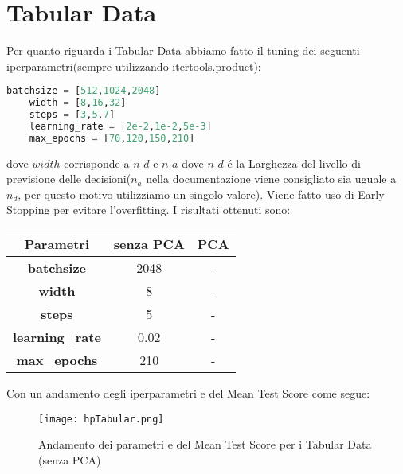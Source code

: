 \documentclass[../../Report.tex]{subfiles}
\begin{document}
\section{Tabular Data}
Per quanto riguarda i Tabular Data abbiamo fatto il tuning dei seguenti iperparametri(sempre utilizzando itertools.product):
\begin{lstlisting}[language=Python]
    batchsize = [512,1024,2048]
    width = [8,16,32]
    steps = [3,5,7]
    learning_rate = [2e-2,1e-2,5e-3]    
    max_epochs = [70,120,150,210]
\end{lstlisting}
dove $width$ corrisponde a $n\_d$ e $n\_a$ dove $n\_d$ é la Larghezza del livello di previsione delle decisioni($n_a$ nella documentazione viene consigliato sia uguale a $n_d$, per questo motivo utilizziamo un singolo valore).
Viene fatto uso di Early Stopping per evitare l'overfitting.
I risultati ottenuti sono:
\begin{table}[h]
    \centering
    \begin{tabular}{|c|c|c|}
    \hline
\textbf{Parametri} & \textbf{senza PCA} & \textbf{PCA} \\ \hline
\textbf{batchsize}& 2048 & -\\
\textbf{width}& 8 &  - \\
\textbf{steps}& 5 & -\\
\textbf{learning\_rate}& 0.02 &  -\\
\textbf{max\_epochs}& 210 & -\\
\hline
\end{tabular}
\end{table}

Con un andamento degli iperparametri e del Mean Test Score come segue:
\begin{figure}
    \centering
    \texttt{[image: hpTabular.png]}
    \caption{Andamento dei parametri e del Mean Test Score per i Tabular Data (senza PCA)}
\end{figure}
\end{document}
